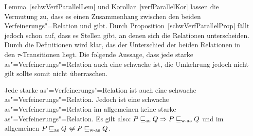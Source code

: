 Lemma~\ref{schwVerfParallelLem} und Korollar~\ref{verfParallelKor} lassen die
Vermutung zu, dass es einen Zusammenhang zwischen den beiden
Verfeinerungs"=Relation \wasRel{} und \asRel{} gibt. Durch
Proposition~\ref{schwVerfParallelProp} fällt jedoch schon auf, dass es Stellen
gibt, an denen sich die Relationen unterscheiden. Durch die Definitionen wird
klar, das der Unterschied der beiden Relationen in den $\tau$-Transitionen
liegt. Die folgende Aussage, dass jede starke as"=Verfeinerungs"=Relation auch
eine schwache ist, die Umkehrung jedoch nicht gilt sollte somit nicht
überraschen.

\begin{Lem}[Zusammenhang der Verfeinerungs"=Relationen]
  \label{ZusammenhWasAsLem}
  Jede starke as"=Verfeinerungs"=Relation ist auch eine schwache
  as"=Verfeinerungs"=Relation. Jedoch ist eine schwache
  as"=Verfeinerungs"=Relation im allgemeinen keine starke
  as"=Verfeinerungs"=Relation. Es gilt also: $P \sqsubseteq _{\mathrm{as}} Q \Rightarrow P \sqsubseteq _{\mathrm{w}\text{-}\mathrm{as}}
  Q$ und im allgemeinen $P \asRel Q \hspace{0.1cm}\not\hspace{-0.1cm}\Leftarrow
  P \wasRel Q$.
\end{Lem}

